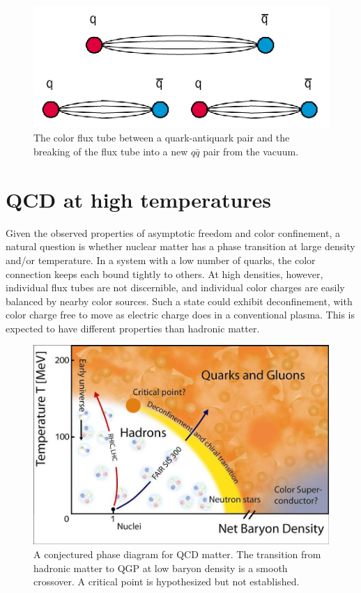 \begin{figure}[t]
  \includegraphics{qqbar_flux.png}
  \caption{The color flux tube between a quark-antiquark pair and the breaking of the flux tube into a new $q\bar{q}$ pair from the vacuum.}
  \label{fig:qqbar_flux}
\end{figure}


\section{QCD at high temperatures}

Given the observed properties of asymptotic freedom and color confinement, a natural question is whether nuclear matter has a phase transition at large density and/or temperature.
In a system with a low number of quarks, the color connection keeps each bound tightly to others.
At high densities, however, individual flux tubes are not discernible, and individual color charges are easily balanced by nearby color sources.
Such a state could exhibit deconfinement, with color charge free to move as electric charge does in a conventional plasma.
This \qgp is expected to have different properties than hadronic matter.

\begin{figure}[t]
  \includegraphics{qcd_phase.jpg}
  \caption{A conjectured phase diagram for QCD matter. The transition from hadronic matter to QGP at low baryon density is a smooth crossover. A critical point is hypothesized but not established.}
  \label{fig:qcd_phase}
\end{figure}

